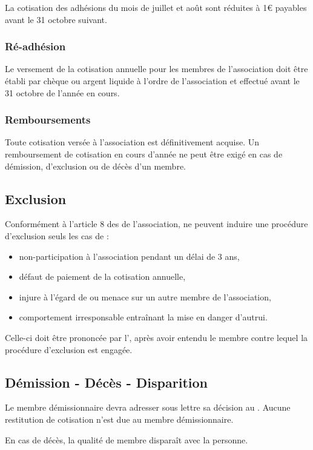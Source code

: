 \documentclass[a4paper,french,10pt]{article}
\begin{document}
La cotisation des adhésions du mois de juillet et août sont réduites à 1\euro{} payables avant le 31 octobre suivant.

\subsubsection*{Ré-adhésion}

Le versement de la cotisation annuelle pour les membres de l'association doit être établi par chèque ou argent liquide à l'ordre de l'association et effectué avant le 31 octobre de l'année en cours.

\subsubsection*{Remboursements}

Toute cotisation versée à l'association est définitivement acquise. Un remboursement de cotisation en cours d'année ne peut être exigé en cas de démission, d'exclusion ou de décès d'un membre.

\subsection{Exclusion}
Conformément à l'article 8 des \statuts{} de l'association, ne peuvent induire une procédure d'exclusion seuls les cas de :
\begin{itemize}
\item non-participation à l'association pendant un délai de 3 ans,
\item défaut de paiement de la cotisation annuelle,
\item injure à l'égard de ou menace sur un autre membre de l'association,
\item comportement irresponsable entraînant la mise en danger d'autrui.
\end{itemize}

Celle-ci doit être prononcée par l'\AG{}, après avoir entendu le membre contre lequel la procédure d'exclusion est engagée.

\subsection{Démission - Décès - Disparition}
Le membre démissionnaire devra adresser sous lettre sa décision au \bureau{}.
Aucune restitution de cotisation n'est due au membre démissionnaire.

En cas de décès, la qualité de membre disparaît avec la personne.
\end{document}
